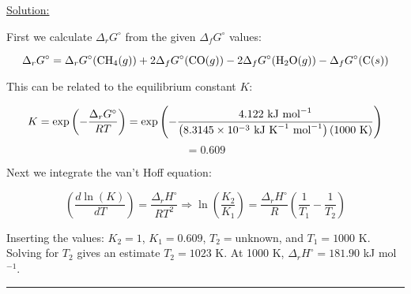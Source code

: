 \noindent
\underline{Solution:}

First we calculate $\Delta_rG^\circ$ from the given $\Delta_fG^\circ$ values:

$$\Delta_rG^\circ = \Delta_rG^\circ(\textnormal{CH}_4(g)) + 2\Delta_fG^\circ(\textnormal{CO}(g)) - 2\Delta_fG^\circ(\textnormal{H}_2\textnormal{O}(g)) - \Delta_fG^\circ(\textnormal{C}(s))$$

This can be related to the equilibrium constant $K$:

$$K = \exp\left(-\frac{\Delta_rG^\circ}{RT}\right) = \exp\left(-\frac{4.122\textnormal{ kJ mol}^{-1}}{\left(8.3145\times 10^{-3}\textnormal{ kJ K}^{-1}\textnormal{ mol}^{-1}\right)\left(1000\textnormal{ K}\right)}\right)$$
$$ = 0.609$$

Next we integrate the van't Hoff equation:

$$\left(\frac{d\ln(K)}{dT}\right) = \frac{\Delta_rH^\circ}{RT^2} \Rightarrow \ln\left(\frac{K_2}{K_1}\right) = \frac{\Delta_rH^\circ}{R}\left(\frac{1}{T_1} - \frac{1}{T_2}\right)$$

Inserting the values: $K_2 = 1$, $K_1 = 0.609$, $T_2 = $unknown, and $T_1 = 1000$ K. Solving for $T_2$ gives an estimate $T_2 = 1023$ K. At 1000 K, $\Delta_rH^\circ = 181.90$ kJ mol$^{-1}$.

\hrule\vspace{0.5cm}

